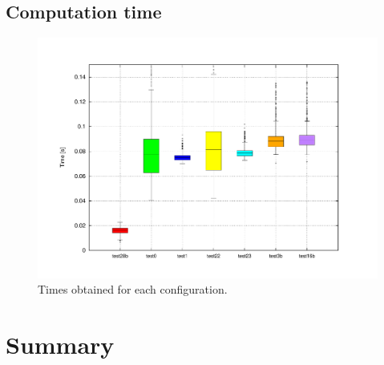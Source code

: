 \subsection{Computation time}\label{ch:chapter04_02_04}

\begin{figure}[h!]
\centering
\includegraphics[trim=50 40 80 60,clip]{times_average}
\caption{Times obtained for each configuration.}\label{fig:cp04_times_average}
\end{figure}



\section{Summary}\label{ch:chapter04_07}

